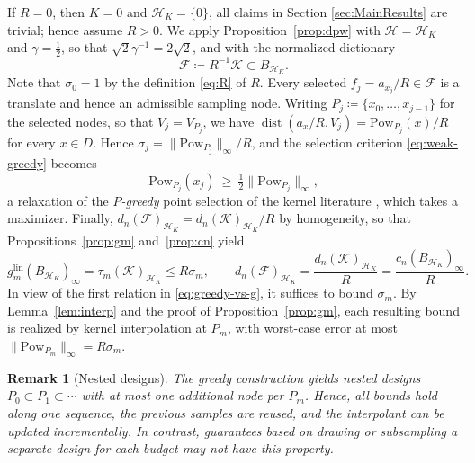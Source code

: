 \documentclass[11pt,reqno, a4paper]{article}
\numberwithin{equation}{section}
\DeclareMathOperator{\dist}{dist}
\newtheorem{remark}[theorem]{Remark}
\newcommand{\lin}{\ensuremath{\mathrm{lin}}}
\newcommand{\norm}[1]{\lVert #1\rVert}
\begin{document}
If $R=0$, then $K=0$ and $\mathcal H_K=\{0\}$, all claims in Section \ref{sec:MainResults} are trivial; hence assume $R>0$.
We apply Proposition~\ref{prop:dpw} with $\mathcal H=\mathcal H_K$ and $\gamma=\tfrac12$, so that $\sqrt2 \gamma^{-1}=2\sqrt2$, and with the normalized dictionary
\begin{equation}\label{eq:Fdef}
    \mathcal{F}\coloneqq R^{-1}\mathcal{K}\subset B_{\mathcal H_K}.
\end{equation}
Note that $\sigma_0=1$ by the definition \eqref{eq:R} of $R$.
Every selected $f_j=a_{x_j}/R \in \mathcal F$ is a translate and hence an admissible sampling node.
Writing $P_j\coloneqq\{x_0,\dots,x_{j-1}\}$ for the selected nodes, so that $V_j=V_{P_j}$, we have $\dist(a_x/R,V_j)=\mathrm{Pow}_{P_j}(x)/R$ for every $x\in D$.
Hence $\sigma_j=\norm{\mathrm{Pow}_{P_j}}_\infty/R$, and the selection criterion \eqref{eq:weak-greedy} becomes
\begin{equation}\label{eq:pgreedy-rule}
    \mathrm{Pow}_{P_j}(x_j)\ \ge\ \tfrac12 \norm{\mathrm{Pow}_{P_j}}_\infty ,
\end{equation}
a relaxation of the \emph{$P$-greedy} point selection of the kernel literature \cite{SH17}, which takes a maximizer.
Finally, $d_n(\mathcal{F})_{\mathcal H_K}=d_n(\mathcal{K})_{\mathcal H_K}/R$ by homogeneity, so that Propositions~\ref{prop:gm} and~\ref{prop:cn} yield
\begin{equation}\label{eq:greedy-vs-g}
g_m^{\lin}(B_{\mathcal H_K})_\infty = \tau_m(\mathcal{K})_{\mathcal{H}_K} \le R \sigma_m,
\qquad
d_n(\mathcal{F})_{\mathcal H_K} = \frac{d_n(\mathcal{K})_{\mathcal H_K}}{R} = \frac{c_n(B_{\mathcal H_K})_\infty}{R}.
\end{equation}
In view of the first relation in \eqref{eq:greedy-vs-g}, it suffices to bound
$\sigma_m$.
By Lemma~\ref{lem:interp} and the proof of Proposition~\ref{prop:gm}, each resulting bound is realized by kernel interpolation at $P_m$, with worst-case error at most $\norm{\mathrm{Pow}_{P_m}}_\infty=R\sigma_m$.

\begin{remark}[Nested designs]\label{rem:nested}
The greedy construction yields nested designs $P_0\subset P_1\subset\cdots$ with at most one additional node per $P_m$.
Hence, all bounds hold along one sequence, the previous samples are reused, and the interpolant can be updated incrementally.
In contrast, guarantees based on drawing or subsampling a separate design for each budget may not have this property.
\end{remark}
\end{document}
